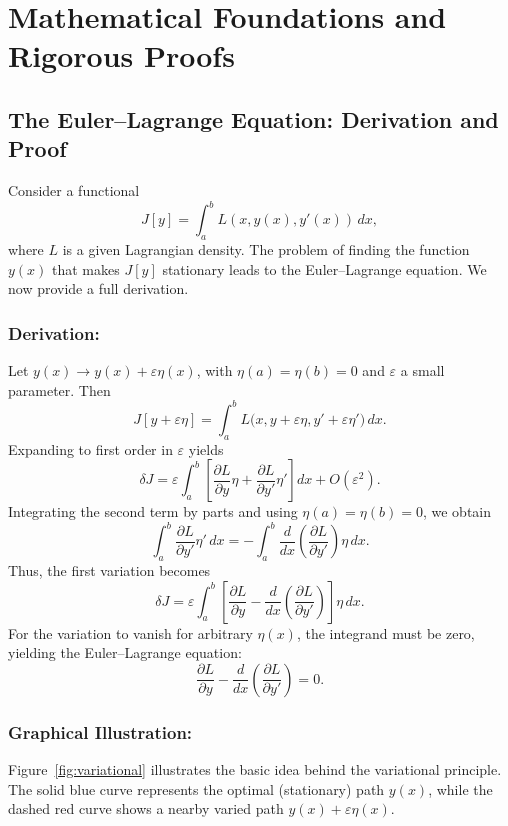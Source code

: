 \documentclass[11pt,a4paper]{article}
\begin{document}
\section{Mathematical Foundations and Rigorous Proofs}

\subsection{The Euler--Lagrange Equation: Derivation and Proof}

Consider a functional
\[
J[y] = \int_{a}^{b} L(x, y(x), y'(x))\, dx,
\]
where \(L\) is a given Lagrangian density. The problem of finding the function \(y(x)\) that makes \(J[y]\) stationary leads to the Euler--Lagrange equation. We now provide a full derivation.

\subsubsection*{Derivation:}
Let \(y(x) \rightarrow y(x) + \varepsilon \eta(x)\), with \(\eta(a)=\eta(b)=0\) and \(\varepsilon\) a small parameter. Then
\[
J[y+\varepsilon \eta] = \int_{a}^{b} L\bigl(x, y+\varepsilon\eta, y'+\varepsilon\eta'\bigr)\, dx.
\]
Expanding to first order in \(\varepsilon\) yields
\[
\delta J = \varepsilon \int_{a}^{b} \left[ \frac{\partial L}{\partial y}\eta + \frac{\partial L}{\partial y'}\eta' \right] dx + O(\varepsilon^2).
\]
Integrating the second term by parts and using \(\eta(a)=\eta(b)=0\), we obtain
\[
\int_{a}^{b} \frac{\partial L}{\partial y'}\eta'\, dx = - \int_{a}^{b} \frac{d}{dx} \left( \frac{\partial L}{\partial y'} \right) \eta\, dx.
\]
Thus, the first variation becomes
\[
\delta J = \varepsilon \int_{a}^{b} \left[ \frac{\partial L}{\partial y} - \frac{d}{dx}\left( \frac{\partial L}{\partial y'} \right) \right] \eta\, dx.
\]
For the variation to vanish for arbitrary \(\eta(x)\), the integrand must be zero, yielding the Euler--Lagrange equation:
\[
\frac{\partial L}{\partial y} - \frac{d}{dx}\left( \frac{\partial L}{\partial y'} \right) = 0.
\]

\subsubsection*{Graphical Illustration:}
Figure~\ref{fig:variational} illustrates the basic idea behind the variational principle. The solid blue curve represents the optimal (stationary) path \(y(x)\), while the dashed red curve shows a nearby varied path \(y(x)+\varepsilon\eta(x)\).
\end{document}
